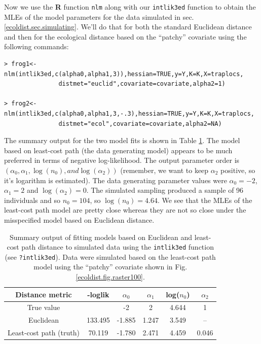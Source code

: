 Now we use the {\bf R} function \mbox{\tt nlm} along with
our \mbox{\tt intlik3ed} function to  obtain the MLEs of the
model parameters for the data simulated
in sec. \ref{ecoldist.sec.simulating}.
 We'll do that for both the standard Euclidean distance
and then for the ecological distance based on the ``patchy''
covariate using the following commands:
{\small
 \begin{verbatim}
> frog1<-nlm(intlik3ed,c(alpha0,alpha1,3)),hessian=TRUE,y=Y,K=K,X=traplocs,
               distmet="euclid",covariate=covariate,alpha2=1)

> frog2<-nlm(intlik3ed,c(alpha0,alpha1,3,-.3),hessian=TRUE,y=Y,K=K,X=traplocs,
               distmet="ecol",covariate=covariate,alpha2=NA)
\end{verbatim}
}
The summary output for the two model fits is shown in Table \ref{ecoldist.tab.results1}.
The model based on least-cost path (the data generating model) appears
to be much preferred in terms of negative log-likelihood.
The output parameter order is $(\alpha_{0}, \alpha_{1}, \log(n_{0}), and
\log(\alpha_{2}))$ (remember, we want to keep $\alpha_{2}$
positive, so it's logarithm is estimated).
The data generating parameter values were
$\alpha_{0} = - 2$,
$\alpha_{1} = 2$ and $\log(\alpha_{2}) = 0$.
The simulated sampling produced a sample of 96 individuals and so
$n_{0} = 104$, so $\log(n_{0}) = 4.64$. We see that the
 MLEs of the least-cost path model are pretty close whereas they are
 not so close under the misspecified model based on Euclidean distance.



\begin{table}
\caption{
Summary output of fitting models based on Euclidean and least-cost
path distance to simulated data using the 
 \mbox{\tt intlik3ed} function (see \mbox{\tt ?intlik3ed}). Data were
 simulated based on the least-cost path model using the ``patchy''
 covariate shown in Fig. \ref{ecoldist.fig.raster100}.
}
\begin{tabular}{cccccc} \hline \hline 
Distance metric &  -loglik &     $\alpha_0$  & $\alpha_1$  &\mbox{log}($n_{0}$) &  $\alpha_2$ \\ \hline
True value      &          &         -2      &    2       &   4.644 & 1 \\
Euclidean   &133.495&  -1.885 &    1.247 &    3.549 &      -- \\
Least-cost path (truth) & 70.119& -1.780 &  2.471    &    4.459 &
0.046  \\ \hline 
\end{tabular}
\label{ecoldist.tab.results1}
\end{table}






